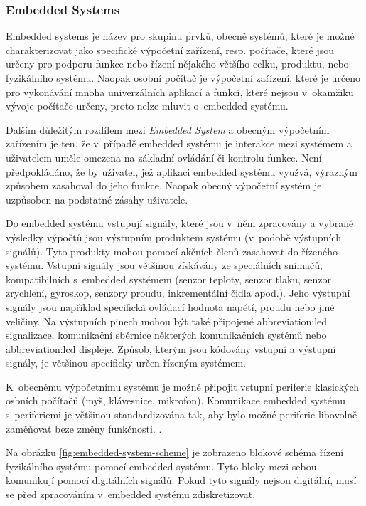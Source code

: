 \documentclass[a4paper, twoside, 11pt]{article}
\begin{document}
	\subsubsection{Embedded Systems}
	Embedded systems je název pro skupinu prvků, obecně systémů, které je možné charakterizovat jako specifické výpočetní zařízení, resp. počítače, které jsou určeny pro podporu funkce nebo řízení nějakého většího celku, produktu, nebo fyzikálního systému. Naopak osobní počítač je výpočetní zařízení, které je určeno pro vykonávání mnoha univerzálních aplikací a funkcí, které nejsou v~okamžiku vývoje počítače určeny, proto nelze mluvit o~embedded systému. \cite{Sass2010}\par
	Dalším důležitým rozdílem mezi \textit{Embedded System} a obecným výpočetním zařízením je ten, že v~případě embedded systému je interakce mezi systémem a uživatelem uměle omezena na základní ovládání či kontrolu funkce. Není předpokládáno, že by uživatel, jež aplikaci embedded systému využvá, výrazným způsobem zasahoval do jeho funkce. Naopak obecný výpočetní systém je uzpůsoben na podstatné zásahy uživatele. \cite{Sass2010} \cite{juan-fpgas}\par
	Do embedded systému vstupují signály, které jsou v~něm zpracovány a vybrané výsledky výpočtů jsou výstupním produktem systému (v~podobě výstupních signálů). Tyto produkty mohou pomocí akčních členů zasahovat do řízeného systému. Vstupní signály jsou většinou získávány ze speciálních snímačů, kompatibilních s~embedded systémem (senzor teploty, senzor tlaku, senzor zrychlení, gyroskop, senzory proudu, inkrementální čidla apod.). Jeho výstupní signály jsou například specifická ovládací hodnota napětí, proudu nebo jiné veličiny. Na výstupních pinech mohou být také připojené \gls{abbreviation:led} signalizace, komunikační sběrnice některých komunikačních systémů nebo \gls{abbreviation:lcd} displeje. Způsob, kterým jsou kódovány vstupní a výstupní signály, je většinou specificky určen řízeným systémem. \cite{Sass2010}\par
	K~obecnému výpočetnímu systému je možné připojit vstupní periferie klasických osbních počítačů (myš, klávesnice, mikrofon). Komunikace embedded systému s~periferiemi je většinou standardizována tak, aby bylo možné periferie libovolně zaměňovat beze změny funkčnosti. \cite{Sass2010}.\par
	Na obrázku \ref{fig:embedded-system-scheme} je zobrazeno blokové schéma řízení fyzikálního systému pomocí embedded systému. Tyto bloky mezi sebou komunikují pomocí digitálních signálů. Pokud tyto signály nejsou digitální, musí se před zpracováním v~embedded systému zdiskretizovat.
\end{document}

